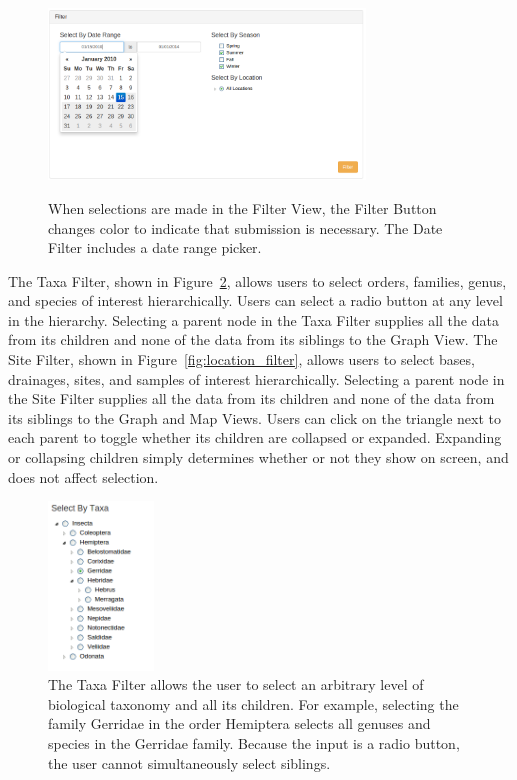 \documentclass[10pt,draftclsnofoot,onecolumn]{IEEEtran}
\begin{document}
\begin{figure}[h]
\centering
\includegraphics[width=0.75\textwidth]{images/date_filter.png}
\label{fig:date_filter}
\captionsetup{justification=centering}
\caption{
  When selections are made in the Filter View, the Filter Button changes color to indicate that submission is necessary.
  The Date Filter includes a date range picker.
}
\end{figure}

The Taxa Filter, shown in Figure~\ref{fig:taxa_filter}, allows users to select orders, families, genus, and species of interest hierarchically.
Users can select a radio button at any level in the hierarchy.
Selecting a parent node in the Taxa Filter supplies all the data from its children and none of the data from its siblings to the Graph View.
The Site Filter, shown in Figure~\ref{fig:location_filter}, allows users to select bases, drainages, sites, and samples of interest hierarchically.
Selecting a parent node in the Site Filter supplies all the data from its children and none of the data from its siblings to the Graph and Map Views.
Users can click on the triangle next to each parent to toggle whether its children are collapsed or expanded.
Expanding or collapsing children simply determines whether or not they show on screen, and does not affect selection.

\begin{figure}[h]
\centering
\includegraphics[width=0.25\textwidth]{images/taxa_filter.png}
\captionsetup{justification=centering}
\caption{
  The Taxa Filter allows the user to select an arbitrary level of biological taxonomy and all its children.
  For example, selecting the family Gerridae in the order Hemiptera selects all genuses and species in the Gerridae family.
  Because the input is a radio button, the user cannot simultaneously select siblings.
}
\label{fig:taxa_filter}
\end{figure}
\end{document}
